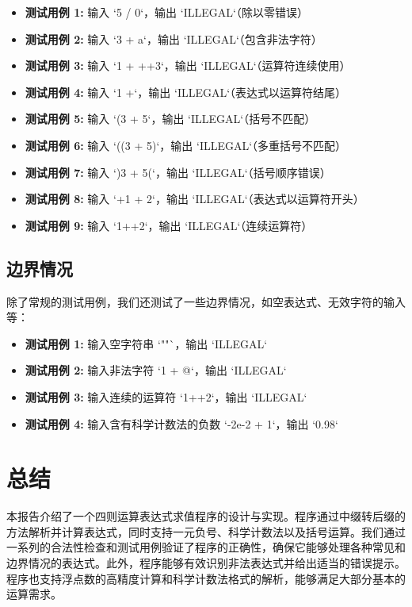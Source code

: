 \documentclass{article}
\begin{document}
\begin{itemize}
    \item \textbf{测试用例 1:} 输入 `5 / 0`，输出 `ILLEGAL`（除以零错误）
    \item \textbf{测试用例 2:} 输入 `3 + a`，输出 `ILLEGAL`（包含非法字符）
    \item \textbf{测试用例 3:} 输入 `1 + ++3`，输出 `ILLEGAL`（运算符连续使用）
    \item \textbf{测试用例 4:} 输入 `1 +`，输出 `ILLEGAL`（表达式以运算符结尾）
    \item \textbf{测试用例 5:} 输入 `(3 + 5`，输出 `ILLEGAL`（括号不匹配）
    \item \textbf{测试用例 6:} 输入 `((3 + 5)`，输出 `ILLEGAL`（多重括号不匹配）
    \item \textbf{测试用例 7:} 输入 `)3 + 5(`，输出 `ILLEGAL`（括号顺序错误）
    \item \textbf{测试用例 8:} 输入 `+1 + 2`，输出 `ILLEGAL`（表达式以运算符开头）
    \item \textbf{测试用例 9:} 输入 `1++2`，输出 `ILLEGAL`（连续运算符）
\end{itemize}

\subsection{边界情况}

除了常规的测试用例，我们还测试了一些边界情况，如空表达式、无效字符的输入等：

\begin{itemize}
    \item \textbf{测试用例 1:} 输入空字符串 `""`，输出 `ILLEGAL`
    \item \textbf{测试用例 2:} 输入非法字符 `1 + @`，输出 `ILLEGAL`
    \item \textbf{测试用例 3:} 输入连续的运算符 `1++2`，输出 `ILLEGAL`
    \item \textbf{测试用例 4:} 输入含有科学计数法的负数 `-2e-2 + 1`，输出 `0.98`
\end{itemize}

\section{总结}

本报告介绍了一个四则运算表达式求值程序的设计与实现。程序通过中缀转后缀的方法解析并计算表达式，同时支持一元负号、科学计数法以及括号运算。我们通过一系列的合法性检查和测试用例验证了程序的正确性，确保它能够处理各种常见和边界情况的表达式。此外，程序能够有效识别非法表达式并给出适当的错误提示。程序也支持浮点数的高精度计算和科学计数法格式的解析，能够满足大部分基本的运算需求。
\end{document}
